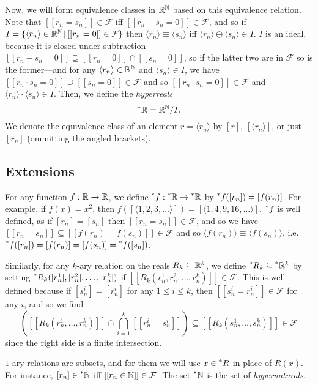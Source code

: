 Now, we will form equivalence classes in $\mathbb{R}^{\mathbb{N}}$ based on this equivalence relation. Note that $[[r_n = s_n]] \in \mathcal{F}$ iff $[[r_n - s_n = 0]] \in \mathcal{F}$, and so if $I = \{\langle r_n \rangle \in \mathbb{R}^{\mathbb{N}} \,|\, [[r_n = 0]] \in \mathcal{F}\}$ then $\langle r_n \rangle \equiv \langle s_n \rangle$ iff $\langle r_n \rangle \ominus \langle s_n \rangle \in I$. $I$ is an ideal, because it is closed under subtraction---$[[r_n - s_n = 0]] \supseteq [[r_n = 0]] \cap [[s_n = 0]]$, so if the latter two are in $\mathcal{F}$ so is the former---and for any $\langle r_n \rangle \in \mathbb{R}^{\mathbb{N}}$ and $\langle s_n \rangle \in I$, we have $[[r_n \cdot s_n = 0]] \supseteq [[s_n = 0]] \in \mathcal{F}$ and so $[[r_n \cdot s_n = 0]] \in \mathcal{F}$ and $\langle r_n \rangle \cdot \langle s_n \rangle \in I$. Then, we define the \textit{hyperreals}
\[ \prescript{*}{}{\mathbb{R}} = \mathbb{R}^{\mathbb{N}} / I. \]
We denote the equivalence class of an element $r = \langle r_n \rangle$ by $[r]$, $[\langle r_n \rangle]$, or just $[r_n]$ (ommitting the angled brackets).

\subsection{Extensions}\label{sec:extensions}

For any function $f: \mathbb{R} \to \mathbb{R}$, we define $\prescript{*}{}{f}: \prescript{*}{}{\mathbb{R}} \to \prescript{*}{}{\mathbb{R}}$ by $\prescript{*}{}{f}([r_n]) = [f(r_n)]$. For example, if $f(x) = x^2$, then $f([\langle 1, 2, 3, \ldots \rangle]) = [\langle 1, 4, 9, 16, \ldots \rangle]$. $\prescript{*}{}{f}$ is well defined, as if $[r_n] = [s_n]$ then $[[r_n = s_n]] \in \mathcal{F}$, and so we have $[[r_n = s_n]] \subseteq [[f(r_n) = f(s_n)]] \in \mathcal{F}$ and so $\langle f(r_n) \rangle \equiv \langle f(s_n) \rangle$, i.e. $\prescript{*}{}{f}([r_n]) = [f(r_n)] = [f(s_n)] = \prescript{*}{}{f}([s_n])$.

Similarly, for any $k$-ary relation on the reals $R_k \subseteq \mathbb{R}^k$, we define $\prescript{*}{}{R}_k \subseteq \prescript{*}{}{\mathbb{R}}^k$ by setting $\prescript{*}{}{R}_k([r_n^1], [r_n^2], \ldots, [r_n^k])$ if $[[R_k(r_n^1, r_n^2, \ldots, r_n^k)]] \in \mathcal{F}$. This is well defined because if $[s_n^i] = [r_n^i]$ for any $1 \leq i \leq k$, then $[[s_n^i = r_n^i]] \in \mathcal{F}$ for any $i$, and so we find
\[
\left([[R_k(r_n^1, \ldots, r_n^k)]] \cap \bigcap_{i = 1}^k [[r_n^i = s_n^i]]\right) \subseteq [[R_k(s_n^1, \ldots, s_n^k)]] \in \mathcal{F}
\]
since the right side is a finite intersection.

$1$-ary relations are subsets, and for them we will use $x \in \prescript{*}{}{R}$ in place of $R(x)$. For instance, $[r_n] \in \prescript{*}{}{\mathbb{N}}$ iff $[[r_n \in \mathbb{N}]] \in \mathcal{F}$. The set $\prescript{*}{}{\mathbb{N}}$ is the set of \textit{hypernaturals}.

